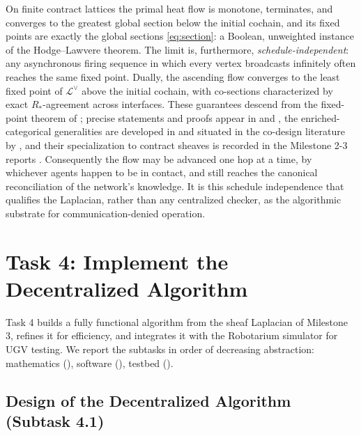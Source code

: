 \documentclass[10pt]{article}
\newcommand{\coLap}{\mathcal{L}^{\scriptscriptstyle\vee}}
\theoremstyle{definition}
\theoremstyle{remark}
\begin{document}
On finite contract lattices the primal heat flow is monotone, terminates, and converges to the greatest global section below the initial cochain, and its fixed points are exactly the global sections \eqref{eq:section}: a Boolean, unweighted instance of the Hodge--Lawvere theorem. The limit is, furthermore, \emph{schedule-independent}: any asynchronous firing sequence in which every vertex broadcasts infinitely often reaches the same fixed point. Dually, the ascending flow converges to the least fixed point of $\coLap$ above the initial cochain, with co-sections characterized by exact $R_{\ast}$-agreement across interfaces.
These guarantees descend from the fixed-point theorem of \citet{Tarski1955}; precise statements and proofs appear in \citet[Thm.~1]{riessDiffusionInformationNetworked2022} and \citet[Thm.~6.10, Prop.~6.15]{ghristCategoricalDiffusionWeighted2026}, the enriched-categorical generalities are developed in \citet{ghristCategoricalDiffusionWeighted2026} and situated in the co-design literature by \citet{riessCo-design2026,zardini2023}, and their specialization to contract sheaves is recorded in the Milestone 2-3 reports \citep{riessSEAMANMS2,riessSEAMANMS3}.
Consequently the flow may be advanced one hop at a time, by whichever agents happen to be in contact, and still reaches the canonical reconciliation of the network's knowledge. It is this schedule independence that qualifies the Laplacian, rather than any centralized checker, as the algorithmic substrate for communication-denied operation.

\section{Task 4: Implement the Decentralized Algorithm}
\label{sec:task4}

Task 4 builds a fully functional algorithm from the sheaf Laplacian of Milestone 3, refines it for efficiency, and integrates it with the Robotarium simulator for UGV testing. We report the subtasks in order of decreasing abstraction: mathematics (), software (), testbed ().

\subsection{Design of the Decentralized Algorithm (Subtask 4.1)}
\label{sec:task41}
\end{document}

